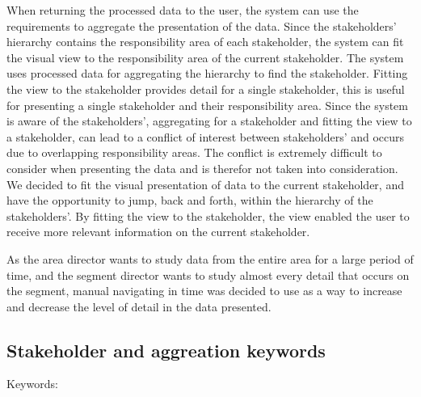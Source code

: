 When returning the processed data to the user, the system can use the 
requirements to aggregate the presentation of the data. Since the stakeholders' hierarchy contains the responsibility area of each stakeholder, the 
system can fit the visual view to the responsibility area of the current 
stakeholder. The system uses processed data for aggregating the hierarchy to 
find the stakeholder. Fitting the view to the stakeholder provides detail for 
a single stakeholder, this is useful for presenting a single stakeholder and 
their responsibility area. Since the system is aware of the stakeholders',
aggregating for a stakeholder and fitting the view to a stakeholder, can lead
to a conflict of interest between stakeholders' and occurs due to overlapping 
responsibility areas. The conflict is extremely difficult to consider when
presenting the data and is therefor not taken into consideration. We decided 
to fit the visual presentation of data to the current stakeholder, and have 
the opportunity to jump, back and forth, within the hierarchy of the
stakeholders'. By fitting the view to the stakeholder, the view enabled the 
user to receive more relevant information on the current stakeholder.

As the area director wants to study data from the entire area for a large 
period of time, and the segment director wants to study almost every detail 
that occurs on the segment, manual navigating in time was decided to use as a 
way to increase and decrease the level of detail in the data presented.

\subsection{Stakeholder and aggreation keywords} %
\label{sub:stakeholder_and_aggreation_keywords}
Keywords:


